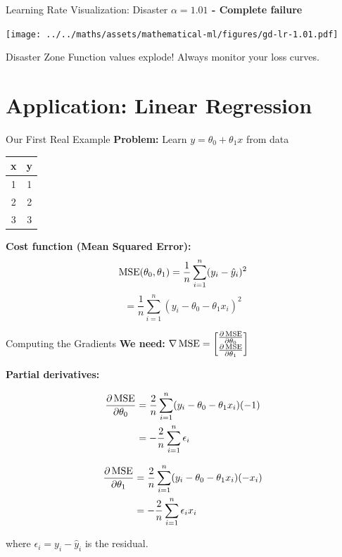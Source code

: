 \documentclass[usenames,dvipsnames]{beamer}
\begin{document}
  \begin{frame}{Learning Rate Visualization: Disaster}
    \textbf{$\alpha = 1.01$ - Complete failure}
    \begin{center}
    \texttt{[image: ../../maths/assets/mathematical-ml/figures/gd-lr-1.01.pdf]}
    \end{center}
    
    \begin{alertbox}{Disaster Zone}
    Function values explode! Always monitor your loss curves.
    \end{alertbox}
  \end{frame}

  \section{Application: Linear Regression}

  \begin{frame}{Our First Real Example}
    \textbf{Problem:} Learn $y = \theta_0 + \theta_1 x$ from data
    
    \begin{center}
    \begin{tabular}{|c|c|}
        \hline
        \textbf{x} & \textbf{y} \\
        \hline
        1 & 1 \\
        2 & 2 \\
        3 & 3 \\
        \hline
    \end{tabular}
    \end{center}
    
    \pause
    \textbf{Cost function (Mean Squared Error):}
    $$\operatorname{MSE}(\theta_0, \theta_1) = \frac{1}{n}\sum_{i=1}^n (y_i - \hat{y}_i)^2$$
    $$= \frac{1}{n}\sum_{i=1}^n (y_i - \theta_0 - \theta_1 x_i)^2$$
  \end{frame}

  \begin{frame}{Computing the Gradients}
    \textbf{We need:} $\nabla \operatorname{MSE} = \begin{bmatrix} \frac{\partial \operatorname{MSE}}{\partial \theta_0} \\ \frac{\partial \operatorname{MSE}}{\partial \theta_1} \end{bmatrix}$
    
    \pause
    \textbf{Partial derivatives:}
    
    \begin{align}
        \frac{\partial \operatorname{MSE}}{\partial \theta_0} &= \frac{2}{n}\sum_{i=1}^n (y_i - \theta_0 - \theta_1 x_i)(-1)\\
        &= -\frac{2}{n}\sum_{i=1}^n \epsilon_i
    \end{align}
    
    \pause
    \begin{align}
        \frac{\partial \operatorname{MSE}}{\partial \theta_1} &= \frac{2}{n}\sum_{i=1}^n (y_i - \theta_0 - \theta_1 x_i)(-x_i)\\
        &= -\frac{2}{n}\sum_{i=1}^n \epsilon_i x_i
    \end{align}
    
    where $\epsilon_i = y_i - \hat{y}_i$ is the residual.
  \end{frame}
\end{document}
